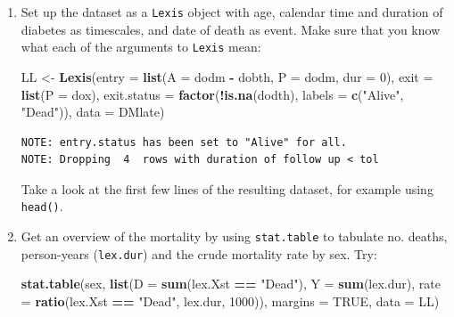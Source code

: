 \documentclass[
]{book}
\newenvironment{Shaded}{\begin{snugshade}}{\end{snugshade}}
\newcommand{\AttributeTok}[1]{\textcolor[rgb]{0.13,0.29,0.53}{#1}}
\newcommand{\ConstantTok}[1]{\textcolor[rgb]{0.56,0.35,0.01}{#1}}
\newcommand{\DecValTok}[1]{\textcolor[rgb]{0.00,0.00,0.81}{#1}}
\newcommand{\FunctionTok}[1]{\textcolor[rgb]{0.13,0.29,0.53}{\textbf{#1}}}
\newcommand{\NormalTok}[1]{#1}
\newcommand{\OtherTok}[1]{\textcolor[rgb]{0.56,0.35,0.01}{#1}}
\newcommand{\SpecialCharTok}[1]{\textcolor[rgb]{0.81,0.36,0.00}{\textbf{#1}}}
\newcommand{\StringTok}[1]{\textcolor[rgb]{0.31,0.60,0.02}{#1}}
\begin{document}
\begin{enumerate}
\def\labelenumi{\arabic{enumi}.}
\item
  Set up the dataset as a \texttt{Lexis} object with age, calendar
  time and duration of diabetes as timescales, and date of death as
  event. Make sure that you know what each of the arguments to
  \texttt{Lexis} mean:

\begin{Shaded}
\begin{Highlighting}[]
\NormalTok{LL }\OtherTok{\textless{}{-}} \FunctionTok{Lexis}\NormalTok{(}\AttributeTok{entry =} \FunctionTok{list}\NormalTok{(}\AttributeTok{A =}\NormalTok{ dodm }\SpecialCharTok{{-}}\NormalTok{ dobth, }
                         \AttributeTok{P =}\NormalTok{ dodm, }
                       \AttributeTok{dur =} \DecValTok{0}\NormalTok{),}
             \AttributeTok{exit =} \FunctionTok{list}\NormalTok{(}\AttributeTok{P =}\NormalTok{ dox),}
      \AttributeTok{exit.status =} \FunctionTok{factor}\NormalTok{(}\SpecialCharTok{!}\FunctionTok{is.na}\NormalTok{(dodth), }
                           \AttributeTok{labels =} \FunctionTok{c}\NormalTok{(}\StringTok{"Alive"}\NormalTok{, }\StringTok{"Dead"}\NormalTok{)),}
             \AttributeTok{data =}\NormalTok{ DMlate)}
\end{Highlighting}
\end{Shaded}

\begin{verbatim}
NOTE: entry.status has been set to "Alive" for all.
NOTE: Dropping  4  rows with duration of follow up < tol
\end{verbatim}

  Take a look at the first few lines of the resulting dataset, for
  example using \texttt{head()}.
\item
  Get an overview of the mortality by using \texttt{stat.table}
  to tabulate no. deaths, person-years (\texttt{lex.dur}) and the
  crude mortality rate by sex. Try:

\begin{Shaded}
\begin{Highlighting}[]
\FunctionTok{stat.table}\NormalTok{(sex,}
           \FunctionTok{list}\NormalTok{(}\AttributeTok{D =} \FunctionTok{sum}\NormalTok{(lex.Xst }\SpecialCharTok{==} \StringTok{"Dead"}\NormalTok{),}
                \AttributeTok{Y =} \FunctionTok{sum}\NormalTok{(lex.dur),}
             \AttributeTok{rate =} \FunctionTok{ratio}\NormalTok{(lex.Xst }\SpecialCharTok{==} \StringTok{"Dead"}\NormalTok{, }
\NormalTok{                          lex.dur, }
                          \DecValTok{1000}\NormalTok{)),}
          \AttributeTok{margins =} \ConstantTok{TRUE}\NormalTok{,}
             \AttributeTok{data =}\NormalTok{ LL)}
\end{Highlighting}
\end{Shaded}


\end{enumerate}
\end{document}
